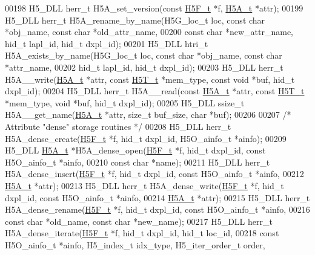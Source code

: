 \begin{DoxyCode}
00198 H5\_DLL herr\_t H5A\_set\_version(\textcolor{keyword}{const} \hyperlink{struct_h5_f__t}{H5F\_t} *f, \hyperlink{struct_h5_a__t}{H5A\_t} *attr);
00199 H5\_DLL herr\_t H5A\_rename\_by\_name(H5G\_loc\_t loc, \textcolor{keyword}{const} \textcolor{keywordtype}{char} *obj\_name, \textcolor{keyword}{const} \textcolor{keywordtype}{char} *old\_attr\_name,
00200     \textcolor{keyword}{const} \textcolor{keywordtype}{char} *new\_attr\_name, hid\_t lapl\_id, hid\_t dxpl\_id);
00201 H5\_DLL htri\_t H5A\_exists\_by\_name(H5G\_loc\_t loc, \textcolor{keyword}{const} \textcolor{keywordtype}{char} *obj\_name, \textcolor{keyword}{const} \textcolor{keywordtype}{char} *attr\_name,
00202     hid\_t lapl\_id, hid\_t dxpl\_id);
00203 H5\_DLL herr\_t H5A\_\_write(\hyperlink{struct_h5_a__t}{H5A\_t} *attr, \textcolor{keyword}{const} \hyperlink{struct_h5_t__t}{H5T\_t} *mem\_type, \textcolor{keyword}{const} \textcolor{keywordtype}{void} *buf, hid\_t dxpl\_id);
00204 H5\_DLL herr\_t H5A\_\_read(\textcolor{keyword}{const} \hyperlink{struct_h5_a__t}{H5A\_t} *attr, \textcolor{keyword}{const} \hyperlink{struct_h5_t__t}{H5T\_t} *mem\_type, \textcolor{keywordtype}{void} *buf, hid\_t dxpl\_id);
00205 H5\_DLL ssize\_t H5A\_\_get\_name(\hyperlink{struct_h5_a__t}{H5A\_t} *attr, \textcolor{keywordtype}{size\_t} buf\_size, \textcolor{keywordtype}{char} *buf);
00206 
00207 \textcolor{comment}{/* Attribute "dense" storage routines */}
00208 H5\_DLL herr\_t H5A\_dense\_create(\hyperlink{struct_h5_f__t}{H5F\_t} *f, hid\_t dxpl\_id, H5O\_ainfo\_t *ainfo);
00209 H5\_DLL \hyperlink{struct_h5_a__t}{H5A\_t} *H5A\_dense\_open(\hyperlink{struct_h5_f__t}{H5F\_t} *f, hid\_t dxpl\_id, \textcolor{keyword}{const} H5O\_ainfo\_t *ainfo,
00210     \textcolor{keyword}{const} \textcolor{keywordtype}{char} *name);
00211 H5\_DLL herr\_t H5A\_dense\_insert(\hyperlink{struct_h5_f__t}{H5F\_t} *f, hid\_t dxpl\_id, \textcolor{keyword}{const} H5O\_ainfo\_t *ainfo,
00212     \hyperlink{struct_h5_a__t}{H5A\_t} *attr);
00213 H5\_DLL herr\_t H5A\_dense\_write(\hyperlink{struct_h5_f__t}{H5F\_t} *f, hid\_t dxpl\_id, \textcolor{keyword}{const} H5O\_ainfo\_t *ainfo,
00214     \hyperlink{struct_h5_a__t}{H5A\_t} *attr);
00215 H5\_DLL herr\_t H5A\_dense\_rename(\hyperlink{struct_h5_f__t}{H5F\_t} *f, hid\_t dxpl\_id, \textcolor{keyword}{const} H5O\_ainfo\_t *ainfo,
00216     \textcolor{keyword}{const} \textcolor{keywordtype}{char} *old\_name, \textcolor{keyword}{const} \textcolor{keywordtype}{char} *new\_name);
00217 H5\_DLL herr\_t H5A\_dense\_iterate(\hyperlink{struct_h5_f__t}{H5F\_t} *f, hid\_t dxpl\_id, hid\_t loc\_id,
00218     \textcolor{keyword}{const} H5O\_ainfo\_t *ainfo, H5\_index\_t idx\_type, H5\_iter\_order\_t order,

\end{DoxyCode}
